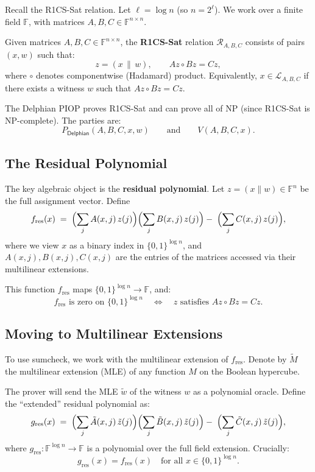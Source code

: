\documentclass[11pt]{article}
\theoremstyle{plain}
\theoremstyle{definition}
\newcommand{\F}{\mathbb{F}}
\begin{document}
Recall the R1CS-Sat relation. Let $\ell = \log n$ (so $n = 2^\ell$). We work
over a finite field $\F$, with matrices $A, B, C \in \F^{n \times n}$.

\begin{defbox}
Given matrices $A, B, C \in \F^{n \times n}$, the \textbf{R1CS-Sat} relation
$\mathcal{R}_{A,B,C}$ consists of pairs $(x, w)$ such that:
\[
  z = (x \,\|\, w), \qquad Az \circ Bz = Cz,
\]
where $\circ$ denotes componentwise (Hadamard) product. Equivalently,
$x \in \mathcal{L}_{A,B,C}$ if there exists a witness $w$ such that
$Az \circ Bz = Cz$.
\end{defbox}

The Delphian PIOP proves R1CS-Sat and can prove all of NP (since R1CS-Sat is
NP-complete). The parties are:
\[
  P_{\mathsf{Delphian}}(A, B, C, x, w) \qquad \text{and} \qquad V(A, B, C, x).
\]

\subsection{The Residual Polynomial}

The key algebraic object is the \textbf{residual polynomial}. Let
$z = (x \| w) \in \F^n$ be the full assignment vector. Define
\[
  f_{\mathrm{res}}(x) \;=\;
  \Bigl(\sum_j A(x,j)\, z(j)\Bigr)
  \Bigl(\sum_j B(x,j)\, z(j)\Bigr)
  -\;
  \Bigl(\sum_j C(x,j)\, z(j)\Bigr),
\]
where we view $x$ as a binary index in $\{0,1\}^{\log n}$, and $A(x,j),
B(x,j), C(x,j)$ are the entries of the matrices accessed via their
multilinear extensions.

This function $f_{\mathrm{res}}$ maps $\{0,1\}^{\log n} \to \F$, and:
\[
  f_{\mathrm{res}} \text{ is zero on } \{0,1\}^{\log n}
  \quad\iff\quad
  z \text{ satisfies } Az \circ Bz = Cz.
\]

\subsection{Moving to Multilinear Extensions}

To use sumcheck, we work with the multilinear extension of $f_{\mathrm{res}}$.
Denote by $\tilde{M}$ the multilinear extension (MLE) of any function $M$ on
the Boolean hypercube.

The prover will send the MLE $\tilde{w}$ of the witness $w$ as a polynomial
oracle. Define the ``extended'' residual polynomial as:
\[
  g_{\mathrm{res}}(x) \;=\;
  \Bigl(\sum_j \tilde{A}(x,j)\,\tilde{z}(j)\Bigr)
  \Bigl(\sum_j \tilde{B}(x,j)\,\tilde{z}(j)\Bigr)
  -\;
  \Bigl(\sum_j \tilde{C}(x,j)\,\tilde{z}(j)\Bigr),
\]
where $g_{\mathrm{res}}: \F^{\log n} \to \F$ is a polynomial over the full
field extension. Crucially:
\[
  g_{\mathrm{res}}(x) = f_{\mathrm{res}}(x) \quad \text{for all } x \in \{0,1\}^{\log n}.
\]
\end{document}
